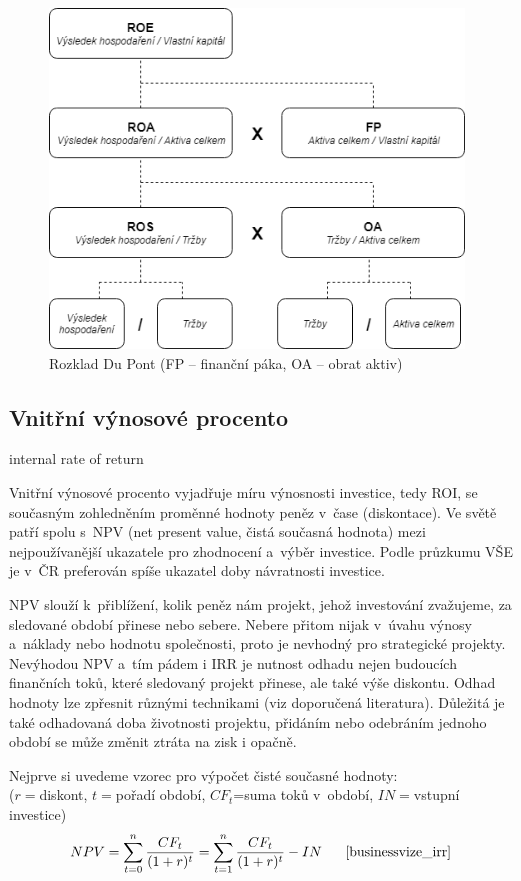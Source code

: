 \begin{figure}
  \centering
  \includegraphics[width=11cm]{img/dupont.png}
  \caption{Rozklad Du Pont \cite{ruck} (FP -- finanční páka, OA -- obrat aktiv)}
  \label{dupont}
\end{figure}

\subsection{Vnitřní výnosové procento}
internal rate of return

Vnitřní výnosové procento vyjadřuje míru výnosnosti investice, tedy ROI, se současným zohledněním proměnné hodnoty peněz v~čase (diskontace). Ve světě patří spolu s~NPV (net present value, čistá současná hodnota) mezi nejpoužívanější ukazatele pro zhodnocení a~výběr investice. Podle průzkumu VŠE je v~ČR preferován spíše ukazatel doby návratnosti investice.\cite{businessvize_irr}

NPV slouží k~přiblížení, kolik peněz nám projekt, jehož investování zvažujeme, za sledované období přinese nebo sebere. Nebere přitom nijak v~úvahu výnosy a~náklady nebo hodnotu společnosti, proto je nevhodný pro strategické projekty. Nevýhodou NPV a~tím pádem i IRR je nutnost odhadu nejen budoucích finančních toků, které sledovaný projekt přinese, ale také výše diskontu. Odhad hodnoty lze zpřesnit různými technikami (viz doporučená literatura). Důležitá je také odhadovaná doba životnosti projektu, přidáním nebo odebráním jednoho období se může změnit ztráta na zisk i opačně.

Nejprve si uvedeme vzorec pro výpočet čisté současné hodnoty: 
\\($r=$diskont, $t=$pořadí období, $CF_t$=suma toků v~období, $IN=$vstupní investice)
$$NPV=\sum\limits_{t=0}^{n} \dfrac{CF_t}{(1+r)^t} = \sum\limits_{t=1}^{n} \dfrac{CF_t}{(1+r)^t} - IN\scite{businessvize_irr}$$

